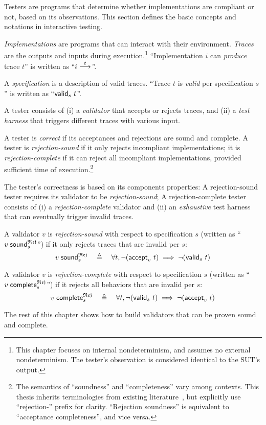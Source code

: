 Testers are programs that determine whether implementations are compliant or
not, based on its observations.  This section defines the basic concepts and
notations in interactive testing.

\begin{definition}
  {\em Implementations} are programs that can interact with their environment.
  {\em Traces} are the outputs and inputs during execution.\footnote{This
    chapter focuses on internal nondeterminism, and assumes no external
    nondeterminism.  The tester's observation is considered identical to the
    SUT's output.}  ``Implementation $i$ can {\em produce} trace $t$'' is
  written as ``$i\overset{t}\longrightarrow_{}$''.
\end{definition}

\begin{definition}
  A {\em specification} is a description of valid traces.  ``Trace $t$ is {\em
    valid} per specification $s$'' is written as ``$\mathsf{valid}_{s}~{t}$''.
\end{definition}

\begin{definition}
  A tester consists of (i) a {\em validator} that accepts or rejects traces, and
  (ii) a {\em test harness} that triggers different traces with various input.

  A tester is {\em correct} if its acceptances and rejections are sound and
  complete.  A tester is {\em rejection-sound} if it only rejects incompliant
  implementations; it is {\em rejection-complete} if it can reject all
  incompliant implementations, provided sufficient time of
  execution.\footnote{The semantics of ``soundness'' and ``completeness'' vary
    among contexts.  This thesis inherits terminologies from existing
    literature~\cite{Tretmans}, but explicitly use ``rejection-'' prefix for
    clarity.  ``Rejection soundness'' is equivalent to ``acceptance
    completeness'', and vice versa.}

  The tester's correctness is based on its components properties: A
  rejection-sound tester requires its validator to be {\em rejection-sound}; A
  rejection-complete tester consists of (i) a {\em rejection-complete} validator
  and (ii) an {\em exhaustive} test harness that can eventually trigger invalid
  traces.
\end{definition}

\begin{definition}
  A validator $v$ is {\em rejection-sound} with respect to specification $s$
  (written as ``$v\;\mathsf{sound}_{s}^\mathfrak{Rej}$'') if it only rejects traces that are invalid
  per $s$:
  \[v\;\mathsf{sound}_{s}^\mathfrak{Rej}\quad\triangleq\quad\forall t,\neg(\mathsf{accept}_{v}~{t})\implies\neg(\mathsf{valid}_{s}~{t})\]

  A validator $v$ is {\em rejection-complete} with respect to specification $s$
  (written as ``$v\;\mathsf{complete}_{s}^\mathfrak{Rej}$'') if it rejects all behaviors that are
  invalid per $s$:
  \[v\;\mathsf{complete}_{s}^\mathfrak{Rej}\quad\triangleq\quad\forall t,\neg(\mathsf{valid}_{s}~{t})\implies\neg(\mathsf{accept}_{v}~{t})\]
\end{definition}

The rest of this chapter shows how to build validators that can be proven sound
and complete.
